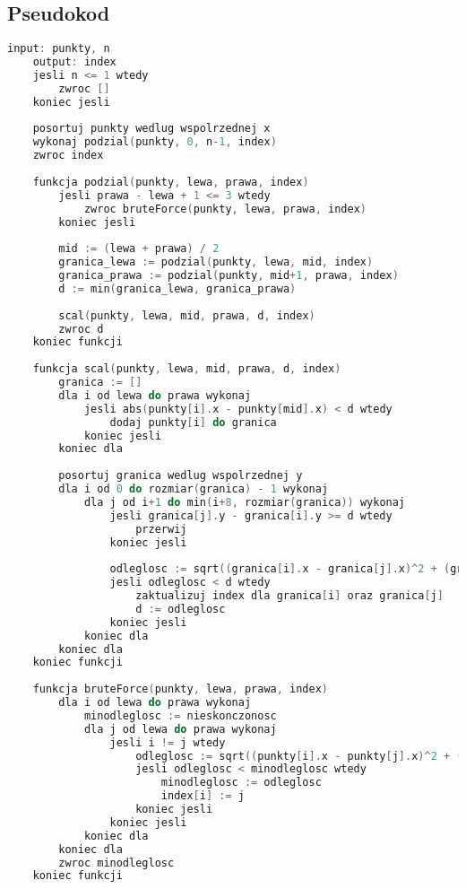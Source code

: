 \documentclass[12pt,twoside]{article}
\begin{document}
\subsection{Pseudokod}
\begin{lstlisting}[language=C++,caption=Pseudokod Dziel i zwyciężaj,label={pseudokoddivide}]
    input: punkty, n
    output: index
    jesli n <= 1 wtedy
        zwroc []
    koniec jesli
    
    posortuj punkty wedlug wspolrzednej x
    wykonaj podzial(punkty, 0, n-1, index)
    zwroc index
    
    funkcja podzial(punkty, lewa, prawa, index)
        jesli prawa - lewa + 1 <= 3 wtedy
            zwroc bruteForce(punkty, lewa, prawa, index)
        koniec jesli
        
        mid := (lewa + prawa) / 2
        granica_lewa := podzial(punkty, lewa, mid, index)
        granica_prawa := podzial(punkty, mid+1, prawa, index)
        d := min(granica_lewa, granica_prawa)
        
        scal(punkty, lewa, mid, prawa, d, index)
        zwroc d
    koniec funkcji
    
    funkcja scal(punkty, lewa, mid, prawa, d, index)
        granica := []
        dla i od lewa do prawa wykonaj
            jesli abs(punkty[i].x - punkty[mid].x) < d wtedy
                dodaj punkty[i] do granica
            koniec jesli
        koniec dla
        
        posortuj granica wedlug wspolrzednej y
        dla i od 0 do rozmiar(granica) - 1 wykonaj
            dla j od i+1 do min(i+8, rozmiar(granica)) wykonaj
                jesli granica[j].y - granica[i].y >= d wtedy
                    przerwij
                koniec jesli
                
                odleglosc := sqrt((granica[i].x - granica[j].x)^2 + (granica[i].y - granica[j].y)^2)
                jesli odleglosc < d wtedy
                    zaktualizuj index dla granica[i] oraz granica[j]
                    d := odleglosc
                koniec jesli
            koniec dla
        koniec dla
    koniec funkcji
    
    funkcja bruteForce(punkty, lewa, prawa, index)
        dla i od lewa do prawa wykonaj
            minodleglosc := nieskonczonosc
            dla j od lewa do prawa wykonaj
                jesli i != j wtedy
                    odleglosc := sqrt((punkty[i].x - punkty[j].x)^2 + (punkty[i].y - punkty[j].y)^2)
                    jesli odleglosc < minodleglosc wtedy
                        minodleglosc := odleglosc
                        index[i] := j
                    koniec jesli
                koniec jesli
            koniec dla
        koniec dla
        zwroc minodleglosc
    koniec funkcji

    \end{lstlisting}
\end{document}
